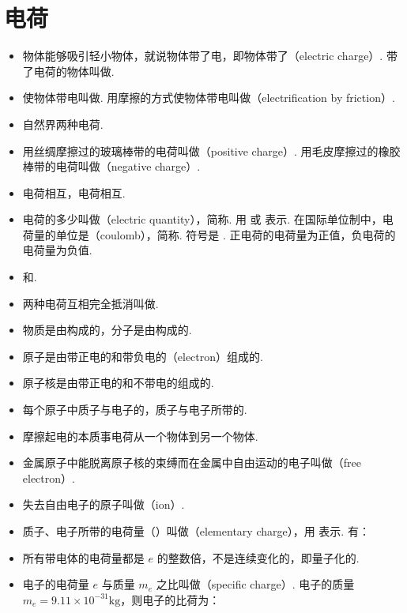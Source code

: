 \newpage
\section{电荷}

\vspace{10pt}
\begin{itemize}
\item 物体能够吸引轻小物体，就说物体带了电，即物体带了（electric charge）. 带了电荷的物体叫做.
\item 使物体带电叫做. 用摩擦的方式使物体带电叫做（electrification by friction）.
\item 自然界两种电荷.
\item 用丝绸摩擦过的玻璃棒带的电荷叫做（positive charge）. 用毛皮摩擦过的橡胶棒带的电荷叫做（negative charge）.
\item {}电荷相互，电荷相互.
\item 电荷的多少叫做（electric quantity），简称. 用  或  表示. 在国际单位制中，电荷量的单位是（coulomb），简称. 符号是 . 正电荷的电荷量为正值，负电荷的电荷量为负值.
\item {}和.
\item 两种电荷互相完全抵消叫做.
\item 物质是由构成的，分子是由构成的.
\item 原子是由带正电的和带负电的（electron）组成的.
\item 原子核是由带正电的和不带电的组成的.
\item 每个原子中质子与电子的，质子与电子所带的.
\item 摩擦起电的本质事电荷从一个物体到另一个物体.
\item 金属原子中能脱离原子核的束缚而在金属中自由运动的电子叫做（free electron）.
\item 失去自由电子的原子叫做（ion）.
\item 质子、电子所带的电荷量（）叫做（elementary charge），用  表示. 有：
\item 所有带电体的电荷量都是 $e$ 的整数倍，不是连续变化的，即量子化的.
\item 电子的电荷量 $e$ 与质量 $m_e$ 之比叫做（specific charge）. 电子的质量 $m_e=9.11\times10^{-31}\text{kg}$，则电子的比荷为：

\end{itemize}
